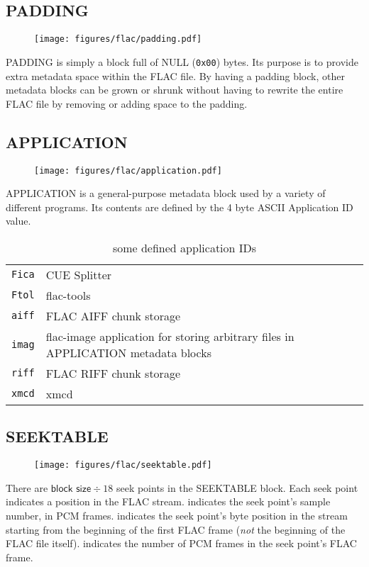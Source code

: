 \clearpage

\subsection{PADDING}
\begin{figure}[h]
  \texttt{[image: figures/flac/padding.pdf]}
\end{figure}
\par
\noindent
PADDING is simply a block full of NULL (\texttt{0x00}) bytes.
Its purpose is to provide extra metadata space within the FLAC file.
By having a padding block, other metadata blocks can be grown or
shrunk without having to rewrite the entire FLAC file by removing or
adding space to the padding.

\subsection{APPLICATION}
\begin{figure}[h]
\texttt{[image: figures/flac/application.pdf]}
\end{figure}
\noindent
APPLICATION is a general-purpose metadata block used by a variety of
different programs.
Its contents are defined by the 4 byte ASCII Application ID value.
\begin{table}[h]
{
\begin{tabular}{rl}
\texttt{Fica} & CUE Splitter \\
\texttt{Ftol} & flac-tools \\
\texttt{aiff} & FLAC AIFF chunk storage \\
\texttt{imag} & flac-image application for storing arbitrary files in APPLICATION metadata blocks \\
\texttt{riff} & FLAC RIFF chunk storage \\
\texttt{xmcd} & xmcd \\
\end{tabular}
}
\caption{some defined application IDs}
\end{table}

\clearpage

\subsection{SEEKTABLE}
\begin{figure}[h]
\texttt{[image: figures/flac/seektable.pdf]}
\end{figure}
\par
\noindent
There are $\textsf{block size} \div 18$ seek points in the SEEKTABLE block.
Each seek point indicates a position in the FLAC stream.
 indicates the seek point's sample number, in PCM frames.
 indicates the seek point's
byte position in the stream starting from the beginning
of the first FLAC frame (\textit{not} the beginning of the FLAC file itself).
 indicates the number of PCM frames
in the seek point's FLAC frame.
